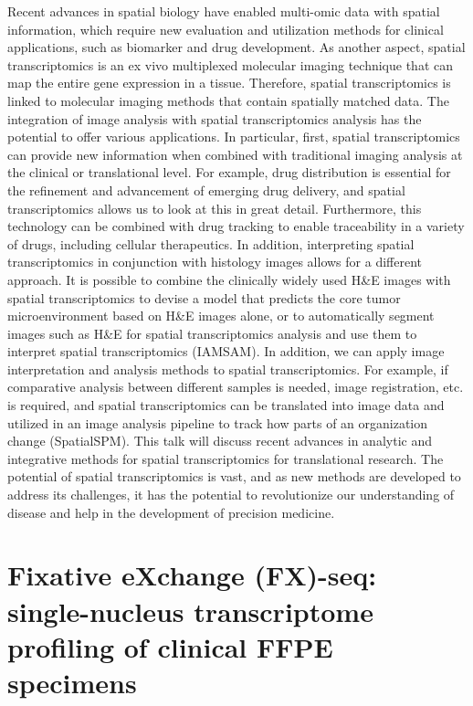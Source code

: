 \noindent
Recent advances in spatial biology have enabled multi-omic data with spatial information, which require new evaluation and utilization methods for clinical applications, such as biomarker and drug development. As another aspect, spatial transcriptomics is an ex vivo multiplexed molecular imaging technique that can map the entire gene expression in a tissue. Therefore, spatial transcriptomics is linked to molecular imaging methods that contain spatially matched data. The integration of image analysis with spatial transcriptomics analysis has the potential to offer various applications. In particular, first, spatial transcriptomics can provide new information when combined with traditional imaging analysis at the clinical or translational level. For example, drug distribution is essential for the refinement and advancement of emerging drug delivery, and spatial transcriptomics allows us to look at this in great detail. Furthermore, this technology can be combined with drug tracking to enable traceability in a variety of drugs, including cellular therapeutics. In addition, interpreting spatial transcriptomics in conjunction with histology images allows for a different approach. It is possible to combine the clinically widely used H\&E images with spatial transcriptomics to devise a model that predicts the core tumor microenvironment based on H\&E images alone, or to automatically segment images such as H\&E for spatial transcriptomics analysis and use them to interpret spatial transcriptomics (IAMSAM). In addition, we can apply image interpretation and analysis methods to spatial transcriptomics. For example, if comparative analysis between different samples is needed, image registration, etc. is required, and spatial transcriptomics can be translated into image data and utilized in an image analysis pipeline to track how parts of an organization change (SpatialSPM). This talk will discuss recent advances in analytic and integrative methods for spatial transcriptomics for translational research. The potential of spatial transcriptomics is vast, and as new methods are developed to address its challenges, it has the potential to revolutionize our understanding of disease and help in the development of precision medicine.
\newpage

\section*{Fixative eXchange (FX)-seq: single-nucleus transcriptome profiling of clinical FFPE specimens}

